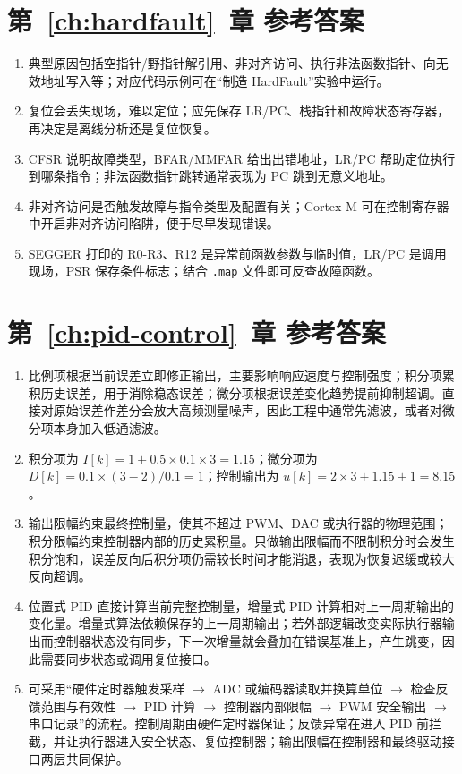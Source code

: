\section*{第~\ref{ch:hardfault}~章 参考答案}

\begin{enumerate}
	\item 典型原因包括空指针/野指针解引用、非对齐访问、执行非法函数指针、向无效地址写入等；对应代码示例可在“制造 HardFault”实验中运行。
	\item 复位会丢失现场，难以定位；应先保存 LR/PC、栈指针和故障状态寄存器，再决定是离线分析还是复位恢复。
	\item CFSR 说明故障类型，BFAR/MMFAR 给出出错地址，LR/PC 帮助定位执行到哪条指令；非法函数指针跳转通常表现为 PC 跳到无意义地址。
	\item 非对齐访问是否触发故障与指令类型及配置有关；Cortex-M 可在控制寄存器中开启非对齐访问陷阱，便于尽早发现错误。
	\item SEGGER 打印的 R0-R3、R12 是异常前函数参数与临时值，LR/PC 是调用现场，PSR 保存条件标志；结合 \texttt{.map} 文件即可反查故障函数。
\end{enumerate}

\section*{第~\ref{ch:pid-control}~章 参考答案}

\begin{enumerate}
	\item 比例项根据当前误差立即修正输出，主要影响响应速度与控制强度；积分项累积历史误差，用于消除稳态误差；微分项根据误差变化趋势提前抑制超调。直接对原始误差作差分会放大高频测量噪声，因此工程中通常先滤波，或者对微分项本身加入低通滤波。
	\item 积分项为 $I[k]=1+0.5\times0.1\times3=1.15$；微分项为 $D[k]=0.1\times(3-2)/0.1=1$；控制输出为 $u[k]=2\times3+1.15+1=8.15$。
	\item 输出限幅约束最终控制量，使其不超过 PWM、DAC 或执行器的物理范围；积分限幅约束控制器内部的历史累积量。只做输出限幅而不限制积分时会发生积分饱和，误差反向后积分项仍需较长时间才能消退，表现为恢复迟缓或较大反向超调。
	\item 位置式 PID 直接计算当前完整控制量，增量式 PID 计算相对上一周期输出的变化量。增量式算法依赖保存的上一周期输出；若外部逻辑改变实际执行器输出而控制器状态没有同步，下一次增量就会叠加在错误基准上，产生跳变，因此需要同步状态或调用复位接口。
	\item 可采用“硬件定时器触发采样 $\rightarrow$ ADC 或编码器读取并换算单位 $\rightarrow$ 检查反馈范围与有效性 $\rightarrow$ PID 计算 $\rightarrow$ 控制器内部限幅 $\rightarrow$ PWM 安全输出 $\rightarrow$ 串口记录”的流程。控制周期由硬件定时器保证；反馈异常在进入 PID 前拦截，并让执行器进入安全状态、复位控制器；输出限幅在控制器和最终驱动接口两层共同保护。
\end{enumerate}

